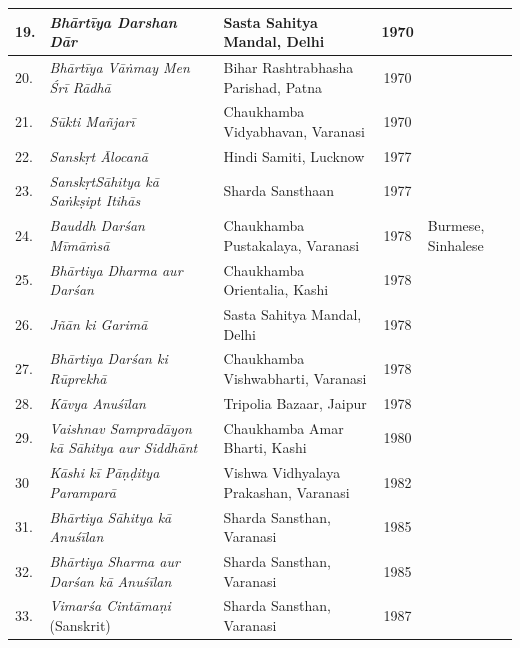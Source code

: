 \begin{longtable}{|l|p{2.9cm}|p{1.8cm}|c|p{1.6cm}|}
\hline
19. & \textit{Bhārtīya Darshan Dār} & Sasta Sahitya Mandal, Delhi & 1970 &   \\
\hline
20. & \textit{Bhārtīya Vāṅmay Men Śrī Rādhā} & Bihar Rashtrabhasha Parishad, Patna & 1970 &   \\
\hline
21. & \textit{Sūkti Mañjarī} & Chaukhamba Vidyabhavan, Varanasi & 1970 &   \\
\hline
22. & \textit{Sanskṛt Ālocanā} & Hindi Samiti, Lucknow & 1977 &   \\
\hline
23. & \textit{SanskṛtSāhitya kā Saṅkṣipt Itihās} & Sharda Sansthaan & 1977 &   \\
\hline
24. & \textit{Bauddh Darśan Mīmāṁsā} & Chaukhamba Pustakalaya, Varanasi & 1978 & Burmese, Sinhalese \\
\hline
25. & \textit{Bhārtiya Dharma aur Darśan} & Chaukhamba Orientalia, Kashi & 1978 &   \\
\hline
26. & \textit{Jñān ki Garimā} & Sasta Sahitya Mandal, Delhi & 1978 &   \\
\hline
27. & \textit{Bhārtiya Darśan ki Rūprekhā} & Chaukhamba Vishwabharti, Varanasi & 1978 &   \\
\hline
28. & \textit{Kāvya Anuśīlan} & Tripolia Bazaar, Jaipur & 1978 &   \\
\hline
29. & \textit{Vaishnav Sampradāyon kā Sāhitya aur Siddhānt} & Chaukhamba Amar Bharti, Kashi & 1980 &   \\
\hline
30 & \textit{Kāshi kī Pāṇḍitya Paramparā} & Vishwa Vidhyalaya Prakashan, Varanasi & 1982 &   \\
\hline
31. & \textit{Bhārtiya Sāhitya kā Anuśīlan} & Sharda Sansthan, Varanasi & 1985 &   \\
\hline
32. & \textit{Bhārtiya Sharma aur Darśan kā Anuśīlan} & Sharda Sansthan, Varanasi & 1985 &   \\
\hline
33. & \textit{Vimarśa Cintāmaṇi} (Sanskrit) & Sharda Sansthan, Varanasi & 1987 &   \\
\hline
\end{longtable}

\theendnotes

